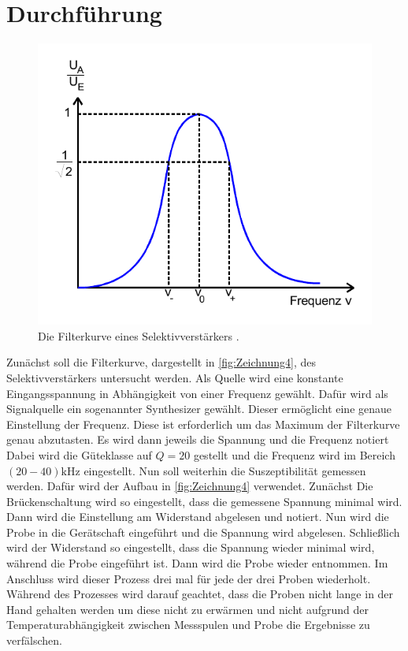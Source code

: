 \section{Durchführung}
\label{sec:Durchführung}
\begin{figure}
    \centering
    \includegraphics[width=\linewidth]{pictures/Zeichnung3.pdf}
    \caption{Die Filterkurve eines Selektivverstärkers \cite{v606}.}
    \label{fig:Zeichnung3}
\end{figure}
Zunächst soll die Filterkurve, dargestellt in \autoref{fig:Zeichnung4}, des Selektivverstärkers untersucht werden.
Als Quelle wird eine konstante Eingangsspannung in Abhängigkeit von einer Frequenz gewählt.
Dafür wird als Signalquelle ein sogenannter Synthesizer gewählt.
Dieser ermöglicht eine genaue Einstellung der Frequenz.
Diese ist erforderlich um das Maximum der Filterkurve genau abzutasten.
Es wird dann jeweils die Spannung und die Frequenz notiert
Dabei wird die Güteklasse auf $Q = 20$ gestellt und die Frequenz wird im Bereich $(20 - 40) \unit{\kilo\hertz}$ eingestellt.
Nun soll weiterhin die Suszeptibilität gemessen werden.
Dafür wird der Aufbau in \autoref{fig:Zeichnung4} verwendet.
Zunächst 
Die Brückenschaltung wird so eingestellt, dass die gemessene Spannung minimal wird.
Dann wird die Einstellung am Widerstand abgelesen und notiert.
Nun wird die Probe in die Gerätschaft eingeführt und die Spannung wird abgelesen.
Schließlich wird der Widerstand so eingestellt, dass die Spannung wieder minimal wird, während die Probe eingeführt ist.
Dann wird die Probe wieder entnommen.
Im Anschluss wird dieser Prozess drei mal für jede der drei Proben wiederholt.
Während des Prozesses wird darauf geachtet, dass die Proben nicht lange in der Hand gehalten werden um diese nicht zu erwärmen
und nicht aufgrund der Temperaturabhängigkeit zwischen Messspulen und Probe die Ergebnisse zu verfälschen.

